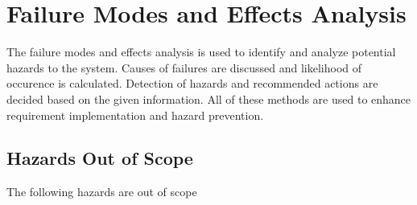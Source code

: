 \documentclass{article}
\begin{document}
\section{Failure Modes and Effects Analysis}
{The failure modes and effects analysis is used to identify and analyze potential 
hazards to the system. Causes of failures are discussed and likelihood of occurence
is calculated. Detection of hazards and recommended actions are decided based on the
given information. All of these methods are used to enhance requirement implementation
and hazard prevention.} 

\subsection{Hazards Out of Scope} 
{The following hazards are out of scope}
\end{document}
